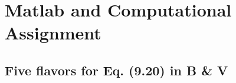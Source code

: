 \documentclass[11pt,a4paper]{article}
\begin{document}
\begin{titlepage}
    \maketitle
\end{titlepage}
\renewcommand{\contentsname}{Table of Contents}
\begin{center} 
    \tableofcontents 
    \listoffigures
\end{center}
\newpage

\section{Matlab and Computational Assignment}
\subsection{Five flavors for Eq. (9.20) in B \& V}
\end{document}
